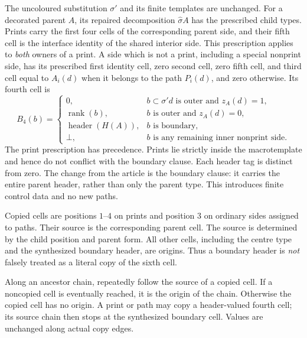 \begin{definition}
\label{def:control/substitution}
The uncoloured substitution $\sigma'$ and its finite templates are unchanged.
For a decorated parent $A$, its repaired decomposition $\widehat\sigma A$
has the prescribed child types. Prints carry the first four cells of the
corresponding parent side, and their fifth cell is the interface identity of the
shared interior side. This prescription applies to \emph{both} owners of a
print. A side which is not a print, including a special nonprint side,
has its prescribed first identity cell, zero second
cell, zero fifth cell, and third cell equal to $A_i(d)$ when it belongs to
the path $P_i(d)$, and zero otherwise. Its fourth cell is
\[
 B_4(b)=
 \begin{cases}
  0,&b\subset\sigma'd\text{ is outer and }z_A(d)=1,\\
  \operatorname{rank}(b),&b\text{ is outer and }z_A(d)=0,\\
  \operatorname{header}(H(A)),&b\text{ is boundary},\\
  \bot,&b\text{ is any remaining inner nonprint side}.
 \end{cases}
\]
The print prescription has precedence. Prints lie strictly inside the
macrotemplate and hence do not conflict with the boundary clause. Each
header tag is distinct from zero. The change from the article is the
boundary clause: it carries the entire parent header, rather than only the
parent type. This introduces finite control data and no new paths.
\end{definition}

\begin{definition}
\label{def:control/origin}
Copied cells are positions $1$--$4$ on prints and position $3$ on ordinary
sides assigned to paths. Their source is the corresponding parent cell.
The source is determined by the child position and parent form. All other
cells, including the centre type and the synthesized boundary header, are
origins. Thus a boundary header is \emph{not} falsely treated as a literal
copy of the sixth cell.

Along an ancestor chain, repeatedly follow the source of a copied cell.
If a noncopied cell is eventually reached, it is the origin of the chain.
Otherwise the copied cell has no origin. A print or path may copy a
header-valued fourth cell; its source chain then stops at the synthesized
boundary cell. Values are unchanged along actual copy edges.
\end{definition}

